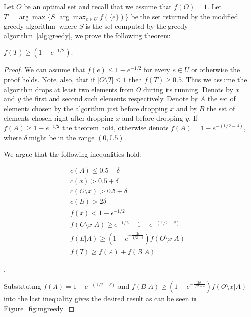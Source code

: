 Let $O$ be an optimal set and recall that we assume that $f(O) = 1$.
Let $T = \arg\max\{S, \displaystyle{\arg\max_{e \in U}}f(\{e\})\}$ 
be the set returned by the modified greedy algorithm, 
where $S$ is the set computed by the greedy algorithm~\ref{alg:greedy},
we prove the following theorem:

\begin{theorem}
$f(T) \geq (1 - e^{-1/2})$.
\end{theorem}

\begin{proof}
We can assume that $f(e) \leq 1 - e^{-1/2}$ for every $e \in U$ or otherwise the proof holds. 
Note, also, that if $|O \setminus T| \leq 1$ then $f(T) \geq 0.5$. 
Thus we assume the algorithm drops at least two elements from $O$ during its running. 
Denote by $x$ and $y$ the first and second such elements respectively.
Denote by $A$ the set of elements chosen by the algorithm just before dropping $x$ and by
$B$ the set of elements chosen right after dropping $x$ and before dropping $y$.
If $f(A) \geq 1 - e^{-1/2}$ the theorem hold, otherwise denote $f(A) = 1 - e^{-(1/2 - \delta)}$,
where $\delta$ might be in the range $(0, 0.5)$.  

We argue that the following inequalities hold:

\begin{align}
c(A) \leq 0.5 - \delta 
\\
c(x) > 0.5 + \delta
\\
c(O \setminus x) > 0.5 + \delta
\\
c(B) > 2\delta
\\
f(x) < 1 - e^{-1/2}
\\
\label{ineq:T}
f(O \setminus x | A) \geq e^{-1/2} - 1 + e^{-(1/2 - \delta)}
\\
\label{ineq:B}
f(B|A) \geq (1 - e^{-\frac{2\delta}{1/2 - \delta}})f(O \setminus x | A)
\\
\label{ineq:T}
f(T) \geq f(A) + f(B|A)
\end{align}

.

Substituting $f(A) = 1 - e^{-(1/2 - \delta)}$ 
and $f(B|A) \geq (1 - e^{-\frac{2\delta}{1/2 - \delta}})f(O \setminus x | A)$
into the last inequality gives the desired result as can be seen in Figure~\ref{fig:mgreedy}
\end{proof}


